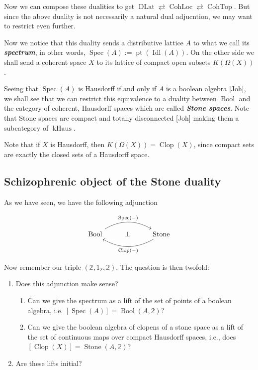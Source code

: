 \documentclass[12pt,a4paper]{article}
\DeclareMathOperator{\Bool}{Bool}
\DeclareMathOperator{\kHaus}{kHaus}
\DeclareMathOperator{\clop}{Clop}
\DeclareMathOperator{\DLat}{DLat}
\DeclareMathOperator{\CohLoc	}{CohLoc}
\DeclareMathOperator{\CohTop}{CohTop}
\DeclareMathOperator{\Stone}{Stone}
\DeclareMathOperator{\pt}{pt}
\DeclareMathOperator{\Idl}{Idl}
\DeclareMathOperator{\Spec}{Spec}
\begin{document}
Now we can compose these dualities to get $\DLat \rightleftarrows \CohLoc \rightleftarrows \CohTop$. But since the above duality is not necessarily a natural dual adjucntion, we may want to restrict even further.

Now we notice that this duality sends a distributive lattice $A$ to what we call its \emph{\textbf{spectrum}}, in other words, $\Spec(A) := \pt(\Idl(A))$. On the other side we shall send a coherent space $X$ to its lattice of compact open subsets $K(\Omega(X))$. 

Seeing that $\Spec(A)$ is Hausdorff if and only if $A$ is a boolean algebra [Joh], we shall see that we can restrict this equivalence to a duality between $\Bool$ and the category of coherent, Hausdorff spaces which are called \emph{\textbf{Stone spaces}}. Note that Stone spaces are compact and totally disconnected [Joh] making them a subcategory of $\kHaus$. 

Note that if $X$ is Hausdorff, then $K(\Omega(X)) = \clop(X)$, since compact sets are exactly the closed sets of a  Hausdorff space.

\subsection{Schizophrenic object of the Stone duality}
As we have seen, we have the following adjunction

\[\begin{tikzcd}
	\Bool & \bot & \Stone
	\arrow["{\Spec(-)}", bend left, from=1-1, to=1-3]
	\arrow["{\clop(-)}", bend left, from=1-3, to=1-1]
\end{tikzcd}\]

Now remember our triple $(\mathbb{2}, 1_{\mathbb{2}}, \mathbb{2})$. The question is then twofold: \begin{enumerate}
 	\item Does this adjunction make sense?
 	\begin{enumerate}
 	\item Can we give the spectrum as a lift of the set of points of a boolean algebra, i.e. $[\Spec(A)] = \Bool(A, \mathbb{2})$?
 	\item  Can we give the boolean algebra of clopens of a stone space as a lift of the set of continuous maps over compact Hausdorff spaces, i.e., does $[\clop(X)] = \Stone(A, \mathbb{2})$?
 	\end{enumerate}
 	\item Are these lifts initial?


 \end{enumerate}
\end{document}
